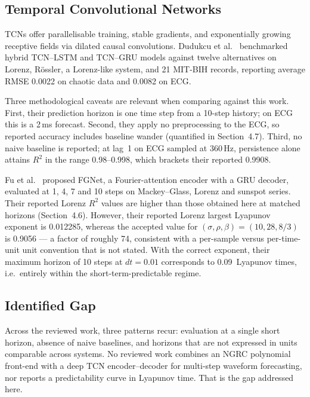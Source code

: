\documentclass[11pt,a4paper]{article}
\begin{document}
\subsection{Temporal Convolutional Networks}

TCNs offer parallelisable training, stable gradients, and exponentially growing receptive fields via dilated causal convolutions.
Dudukcu et al.~\cite{dudukcu2023} benchmarked hybrid TCN--LSTM and TCN--GRU models against twelve alternatives on Lorenz, R\"ossler, a Lorenz-like system, and 21 MIT-BIH records, reporting average RMSE 0.0022 on chaotic data and 0.0082 on ECG.

Three methodological caveats are relevant when comparing against this work.
First, their prediction horizon is one time step from a 10-step history; on ECG this is a 2\,ms forecast.
Second, they apply no preprocessing to the ECG, so reported accuracy includes baseline wander (quantified in Section~4.7).
Third, no naive baseline is reported; at lag~1 on ECG sampled at 360\,Hz, persistence alone attains $R^2$ in the range 0.98--0.998, which brackets their reported 0.9908.

Fu et al.~\cite{fu2024} proposed FGNet, a Fourier-attention encoder with a GRU decoder, evaluated at 1, 4, 7 and 10 steps on Mackey--Glass, Lorenz and sunspot series.
Their reported Lorenz $R^2$ values are higher than those obtained here at matched horizons (Section~4.6).
However, their reported Lorenz largest Lyapunov exponent is 0.012285, whereas the accepted value for $(\sigma, \rho, \beta) = (10, 28, 8/3)$ is 0.9056 --- a factor of roughly 74, consistent with a per-sample versus per-time-unit unit convention that is not stated.
With the correct exponent, their maximum horizon of 10 steps at $dt = 0.01$ corresponds to 0.09~Lyapunov times, i.e.\ entirely within the short-term-predictable regime.

\subsection{Identified Gap}

Across the reviewed work, three patterns recur: evaluation at a single short horizon, absence of naive baselines, and horizons that are not expressed in units comparable across systems.
No reviewed work combines an NGRC polynomial front-end with a deep TCN encoder--decoder for multi-step waveform forecasting, nor reports a predictability curve in Lyapunov time.
That is the gap addressed here.


\end{document}
